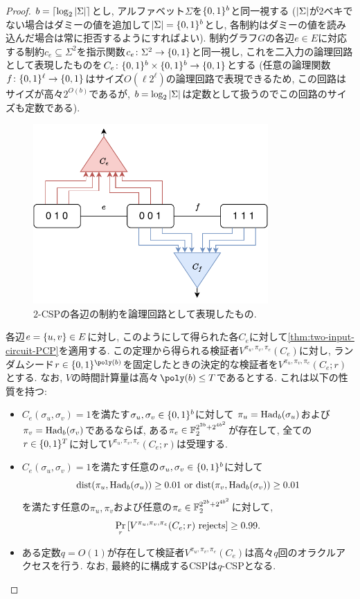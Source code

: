 \begin{proof}
  $b = \lceil\log_2\abs{\Sigma}\rceil$とし, アルファベット$\Sigma$を$\{0,1\}^b$と同一視する
  ($\abs{\Sigma}$が2ベキでない場合はダミーの値を追加して$\abs{\Sigma}=\{0,1\}^b$とし, 各制約はダミーの値を読み込んだ場合は常に拒否するようにすればよい).
  制約グラフ$G$の各辺$e\in E$に対応する制約$c_e\subseteq \Sigma^2$を指示関数$c_e\colon\Sigma^2\to\{0,1\}$と同一視し, これを二入力の論理回路として表現したものを$C_e\colon \{0,1\}^b\times \{0,1\}^b\to \{0,1\}$とする (任意の論理関数$f\colon\{0,1\}^\ell\to\{0,1\}$はサイズ$O(\ell2^\ell)$の論理回路で表現できるため, この回路はサイズが高々$2^{O(b)}$であるが, $b=\log_2\abs{\Sigma}$は定数として扱うのでこの回路のサイズも定数である).

  \begin{figure}[ht]
    \centering
    \includegraphics[width=0.8\textwidth]{images/newCSP.pdf}
    \caption{$2$-CSPの各辺の制約を論理回路として表現したもの. \label{fig:newCSP}}
  \end{figure}

  各辺$e=\qty{u,v}\in E$に対し, このようにして得られた各$C_e$に対して\cref{thm:two-input-circuit-PCP}を適用する.
  この定理から得られる検証者$V^{\pi_u,\pi_v,\pi_e}(C_e)$に対し,
  ランダムシード$r\in\binset^{\poly(b)}$を固定したときの決定的な検証者を$V^{\pi_u,\pi_v,\pi_e}(C_e;r)$とする. なお, $V$の時間計算量は高々$\poly(b)\le T$であるとする.
  これは以下の性質を持つ:
  \begin{itemize}
    \item $C_e(\sigma_u,\sigma_v)=1$を満たす$\sigma_u,\sigma_v\in\{0,1\}^b$に対して $\pi_u=\mathrm{Had}_b(\sigma_u)$および$\pi_v=\mathrm{Had}_b(\sigma_v)$であるならば, ある$\pi_e\in \mathbb{F}_2^{2^{2b} + 2^{4b^2}}$が存在して, 全ての$r\in\{0,1\}^T$に対して$V^{\pi_u,\pi_v,\pi_e}(C_e;r)$は受理する.
    \item $C_e(\sigma_u,\sigma_v)=1$を満たす任意の$\sigma_u,\sigma_v\in\{0,1\}^b$に対して
    \[\mathrm{dist}(\pi_u,\mathrm{Had}_b(\sigma_u))\ge0.01 \text{ or }\mathrm{dist}(\pi_v,\mathrm{Had}_b(\sigma_v))\ge0.01\]
    を満たす任意の$\pi_u,\pi_v$および任意の$\pi_e \in \mathbb{F}_2^{2^{2b} + 2^{4b^2}}$に対して, \[\Pr_r\qty[V^{\pi_u,\pi_v,\pi_e}(C_e;r)\text{ rejects}]\ge 0.99.\]
    \item ある定数$q=O(1)$が存在して検証者$V^{\pi_u,\pi_v,\pi_e}(C_e)$は高々$q$回のオラクルアクセスを行う. なお, 最終的に構成するCSPは$q$-CSPとなる.
  \end{itemize}
  

\end{proof}
